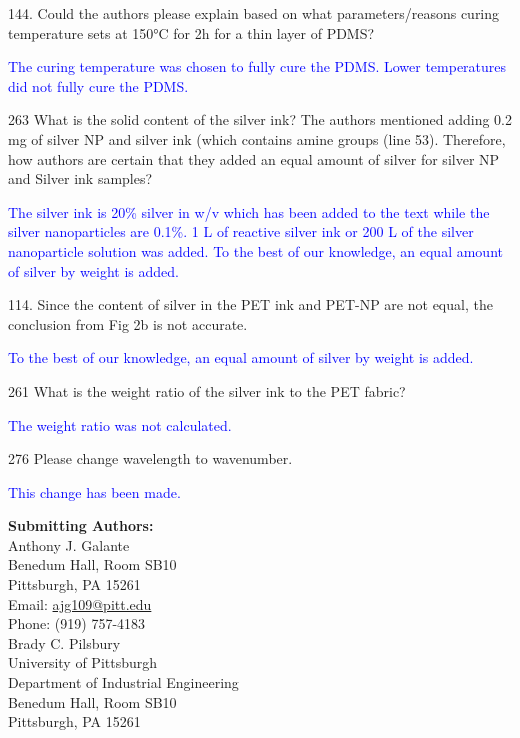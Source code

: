 \documentclass[12pt]{letter}
\newcommand{\blue}[1]{\textcolor{blue}{#1}} %
\begin{document}
144. Could the authors please explain based on what parameters/reasons curing temperature sets at 150°C for 2h for a thin layer of PDMS?

\blue{The curing temperature was chosen to fully cure the PDMS. Lower temperatures did not fully cure the PDMS. }

263 What is the solid content of the silver ink?
The authors mentioned adding 0.2 mg of silver NP and silver ink (which contains amine groups (line 53). Therefore, how authors are certain that they added an equal amount of silver for silver NP and Silver ink samples?

\blue{The silver ink is 20\% silver in w/v which has been added to the text while the silver nanoparticles are 0.1\%. 1 \micro L of reactive silver ink or 200 \micro L of the silver nanoparticle solution was added. To the best of our knowledge, an equal amount of silver by weight is added. }

114. Since the content of silver in the PET ink and PET-NP are not equal, the conclusion from Fig 2b is not accurate.

\blue{To the best of our knowledge, an equal amount of silver by weight is added.}

261 What is the weight ratio of the silver ink to the PET fabric?

\blue{The weight ratio was not calculated. }

276 Please change wavelength to wavenumber.

\blue{This change has been made. }

\newpage


\textbf{Submitting Authors:}\\
Anthony J. Galante\\
Benedum Hall, Room SB10 \\
Pittsburgh, PA 15261\\
Email:  \href{mailto:ajg109@pitt.edu}{ajg109@pitt.edu}\\
Phone: (919) 757-4183\\

Brady C. Pilsbury \\
University of Pittsburgh \\
Department of Industrial Engineering \\
Benedum Hall, Room SB10 \\
Pittsburgh, PA 15261\\
\end{document}
